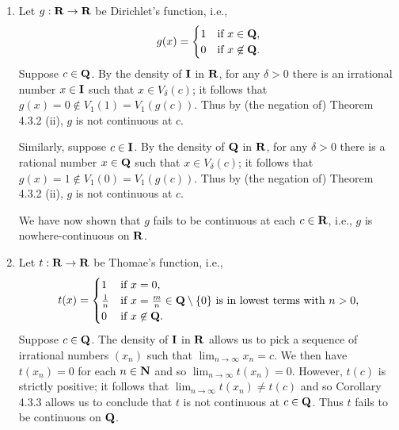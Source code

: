\documentclass{lew98_solutions}
\begin{document}
\begin{solution}
    \begin{enumerate}
        \item Let \( g : \mathbf{R} \to \mathbf{R} \) be Dirichlet's function, i.e.,
        \[
            g(x) = \begin{cases}
                1 & \text{if } x \in \mathbf{Q}, \\
                0 & \text{if } x \not\in \mathbf{Q}.
            \end{cases}
        \]
        Suppose \( c \in \mathbf{Q} \). By the density of \( \mathbf{I} \) in \( \mathbf{R} \), for any \( \delta > 0 \) there is an irrational number \( x \in \mathbf{I} \) such that \( x \in V_{\delta}(c) \); it follows that \( g(x) = 0 \not\in V_1(1) = V_1(g(c)) \). Thus by (the negation of) Theorem 4.3.2 (ii), \( g \) is not continuous at \( c \).

        Similarly, suppose \( c \in \mathbf{I} \). By the density of \( \mathbf{Q} \) in \( \mathbf{R} \), for any \( \delta > 0 \) there is a rational number \( x \in \mathbf{Q} \) such that \( x \in V_{\delta}(c) \); it follows that \( g(x) = 1 \not\in V_1(0) = V_1(g(c)) \). Thus by (the negation of) Theorem 4.3.2 (ii), \( g \) is not continuous at \( c \).

        We have now shown that \( g \) fails to be continuous at each \( c \in \mathbf{R} \), i.e., \( g \) is nowhere-continuous on \( \mathbf{R} \).

        \item Let \( t : \mathbf{R} \to \mathbf{R} \) be Thomae's function, i.e.,
        \[
            t(x) = \begin{cases}
                1 & \text{if } x = 0, \\
                \tfrac{1}{n} & \text{if } x = \tfrac{m}{n} \in \mathbf{Q} \setminus \{ 0 \} \text{ is in lowest terms with } n > 0, \\
                0 & \text{if } x \not\in \mathbf{Q}.
            \end{cases}
        \]
        Suppose \( c \in \mathbf{Q} \). The density of \( \mathbf{I} \) in \( \mathbf{R} \) allows us to pick a sequence of irrational numbers \( (x_n) \) such that \( \lim_{n \to \infty} x_n = c \). We then have \( t(x_n) = 0 \) for each \( n \in \mathbf{N} \) and so \( \lim_{n \to \infty} t(x_n) = 0 \). However, \( t(c) \) is strictly positive; it follows that \( \lim_{n \to \infty} t(x_n) \neq t(c) \) and so Corollary 4.3.3 allows us to conclude that \( t \) is not continuous at \( c \in \mathbf{Q} \). Thus \( t \) fails to be continuous on \( \mathbf{Q} \).


\end{enumerate}
\end{solution}
\end{document}
